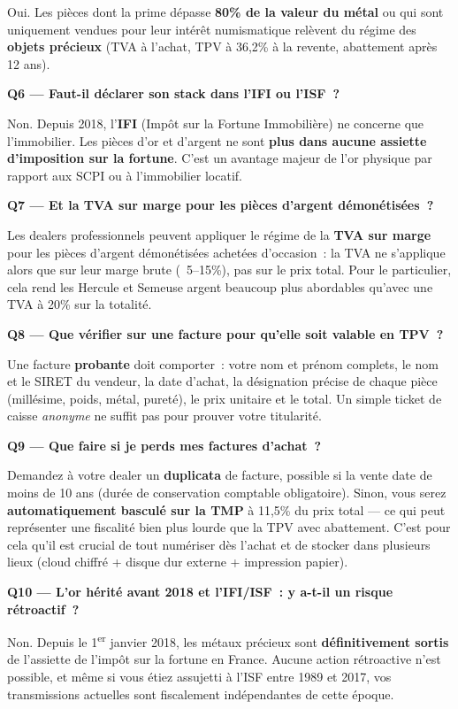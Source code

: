 \documentclass[14pt,a4paper]{extarticle}
\begin{document}
Oui. Les pièces dont la prime dépasse \textbf{80\% de la valeur du métal} ou qui sont uniquement vendues pour leur intérêt numismatique relèvent du régime des \textbf{objets précieux} (TVA à l'achat, TPV à 36,2\% à la revente, abattement après 12 ans).

\textbf{Q6 --- Faut-il déclarer son stack dans l'IFI ou l'ISF~?}

Non. Depuis 2018, l'\textbf{IFI} (Impôt sur la Fortune Immobilière) ne concerne que l'immobilier. Les pièces d'or et d'argent ne sont \textbf{plus dans aucune assiette d'imposition sur la fortune}. C'est un avantage majeur de l'or physique par rapport aux SCPI ou à l'immobilier locatif.

\textbf{Q7 --- Et la TVA sur marge pour les pièces d'argent démonétisées~?}

Les dealers professionnels peuvent appliquer le régime de la \textbf{TVA sur marge} pour les pièces d'argent démonétisées achetées d'occasion~: la TVA ne s'applique alors que sur leur marge brute (~5--15\%), pas sur le prix total. Pour le particulier, cela rend les Hercule et Semeuse argent beaucoup plus abordables qu'avec une TVA à 20\% sur la totalité.

\textbf{Q8 --- Que vérifier sur une facture pour qu'elle soit valable en TPV~?}

Une facture \textbf{probante} doit comporter~: votre nom et prénom complets, le nom et le SIRET du vendeur, la date d'achat, la désignation précise de chaque pièce (millésime, poids, métal, pureté), le prix unitaire et le total. Un simple ticket de caisse \textit{anonyme} ne suffit pas pour prouver votre titularité.

\textbf{Q9 --- Que faire si je perds mes factures d'achat~?}

Demandez à votre dealer un \textbf{duplicata} de facture, possible si la vente date de moins de 10 ans (durée de conservation comptable obligatoire). Sinon, vous serez \textbf{automatiquement basculé sur la TMP} à 11,5\% du prix total --- ce qui peut représenter une fiscalité bien plus lourde que la TPV avec abattement. C'est pour cela qu'il est crucial de tout numériser dès l'achat et de stocker dans plusieurs lieux (cloud chiffré + disque dur externe + impression papier).

\textbf{Q10 --- L'or hérité avant 2018 et l'IFI/ISF~: y a-t-il un risque rétroactif~?}

Non. Depuis le 1\textsuperscript{er} janvier 2018, les métaux précieux sont \textbf{définitivement sortis} de l'assiette de l'impôt sur la fortune en France. Aucune action rétroactive n'est possible, et même si vous étiez assujetti à l'ISF entre 1989 et 2017, vos transmissions actuelles sont fiscalement indépendantes de cette époque.
\end{document}
